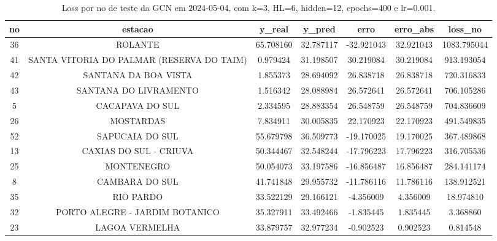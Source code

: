 \begin{table}[h]
\centering
\caption{Loss por no de teste da GCN em 2024-05-04, com k=3, HL=6, hidden=12, epochs=400 e lr=0.001.}
\label{tab:gcn_loss_k3_hl6_h12_e400_d20240504}
\begin{tabular}{ccccccc}
\toprule
no & estacao & y\_real & y\_pred & erro & erro\_abs & loss\_no \\
\midrule
36 & ROLANTE & 65.708160 & 32.787117 & -32.921043 & 32.921043 & 1083.795044 \\
41 & SANTA VITORIA DO PALMAR (RESERVA DO TAIM) & 0.979424 & 31.198507 & 30.219084 & 30.219084 & 913.193054 \\
42 & SANTANA DA BOA VISTA & 1.855373 & 28.694092 & 26.838718 & 26.838718 & 720.316833 \\
43 & SANTANA DO LIVRAMENTO & 1.516342 & 28.088984 & 26.572641 & 26.572641 & 706.105286 \\
5 & CACAPAVA DO SUL & 2.334595 & 28.883354 & 26.548759 & 26.548759 & 704.836609 \\
26 & MOSTARDAS & 7.834911 & 30.005835 & 22.170923 & 22.170923 & 491.549835 \\
52 & SAPUCAIA DO SUL & 55.679798 & 36.509773 & -19.170025 & 19.170025 & 367.489868 \\
13 & CAXIAS DO SUL - CRIUVA & 50.344467 & 32.548244 & -17.796223 & 17.796223 & 316.705536 \\
25 & MONTENEGRO & 50.054073 & 33.197586 & -16.856487 & 16.856487 & 284.141174 \\
8 & CAMBARA DO SUL & 41.741848 & 29.955732 & -11.786116 & 11.786116 & 138.912521 \\
35 & RIO PARDO & 33.522129 & 29.166121 & -4.356009 & 4.356009 & 18.974810 \\
32 & PORTO ALEGRE - JARDIM BOTANICO & 35.327911 & 33.492466 & -1.835445 & 1.835445 & 3.368860 \\
23 & LAGOA VERMELHA & 33.879757 & 32.977234 & -0.902523 & 0.902523 & 0.814548 \\
\bottomrule
\end{tabular}
\end{table}
